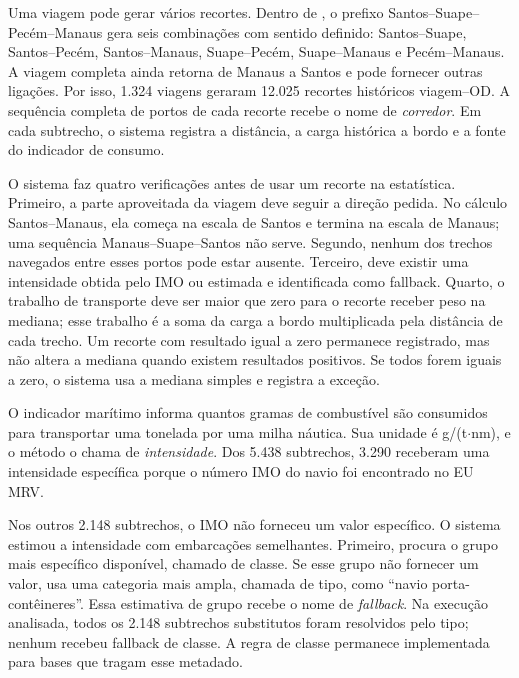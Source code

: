 Uma viagem pode gerar vários recortes. Dentro de , o prefixo Santos--Suape--Pecém--Manaus gera seis combinações com sentido definido: Santos--Suape, Santos--Pecém, Santos--Manaus, Suape--Pecém, Suape--Manaus e Pecém--Manaus. A viagem completa ainda retorna de Manaus a Santos e pode fornecer outras ligações. Por isso, 1.324 viagens geraram 12.025 recortes históricos viagem--OD. A sequência completa de portos de cada recorte recebe o nome de \emph{corredor}. Em cada subtrecho, o sistema registra a distância, a carga histórica a bordo e a fonte do indicador de consumo.

O sistema faz quatro verificações antes de usar um recorte na estatística. Primeiro, a parte aproveitada da viagem deve seguir a direção pedida. No cálculo Santos--Manaus, ela começa na escala de Santos e termina na escala de Manaus; uma sequência Manaus--Suape--Santos não serve. Segundo, nenhum dos trechos navegados entre esses portos pode estar ausente. Terceiro, deve existir uma intensidade obtida pelo IMO ou estimada e identificada como fallback. Quarto, o trabalho de transporte deve ser maior que zero para o recorte receber peso na mediana; esse trabalho é a soma da carga a bordo multiplicada pela distância de cada trecho. Um recorte com resultado igual a zero permanece registrado, mas não altera a mediana quando existem resultados positivos. Se todos forem iguais a zero, o sistema usa a mediana simples e registra a exceção.

O indicador marítimo informa quantos gramas de combustível são consumidos para transportar uma tonelada por uma milha náutica. Sua unidade é g/(t$\cdot$nm), e o método o chama de \emph{intensidade}. Dos 5.438 subtrechos, 3.290 receberam uma intensidade específica porque o número IMO do navio foi encontrado no EU MRV.

Nos outros 2.148 subtrechos, o IMO não forneceu um valor específico. O sistema estimou a intensidade com embarcações semelhantes. Primeiro, procura o grupo mais específico disponível, chamado de classe. Se esse grupo não fornecer um valor, usa uma categoria mais ampla, chamada de tipo, como ``navio porta-contêineres''. Essa estimativa de grupo recebe o nome de \emph{fallback}. Na execução analisada, todos os 2.148 subtrechos substitutos foram resolvidos pelo tipo; nenhum recebeu fallback de classe. A regra de classe permanece implementada para bases que tragam esse metadado.

